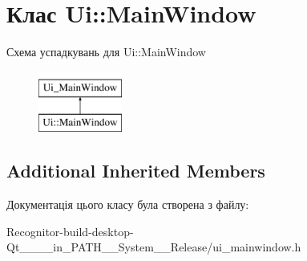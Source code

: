 \hypertarget{classUi_1_1MainWindow}{\section{Клас Ui\-:\-:Main\-Window}
\label{classUi_1_1MainWindow}
}
Схема успадкувань для Ui\-:\-:Main\-Window\begin{figure}[H]
\begin{center}
\leavevmode
\includegraphics[height=2.000000cm]{classUi_1_1MainWindow}
\end{center}
\end{figure}
\subsection*{Additional Inherited Members}


Документація цього класу була створена з файлу\-:\begin{DoxyCompactItemize}
\item 
Recognitor-\/build-\/desktop-\/\-Qt\-\_\-\_\-\_\-\_\-in\-\_\-\-P\-A\-T\-H\-\_\-\-\_\-\-System\-\_\-\-\_\-\-Release/ui\-\_\-mainwindow.\-h\end{DoxyCompactItemize}
